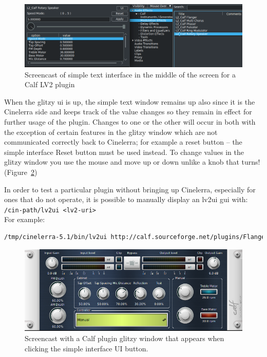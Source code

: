 \begin{figure}[htpb]
    \centering
    \includegraphics[width=0.9\linewidth]{images/calf.png}
    \caption{Screencast of simple text interface in the middle of the screen for a Calf LV2 plugin}
    \label{fig:calf}
\end{figure}

When the glitzy ui is up, the simple text window remains up also since it is the Cinelerra side and keeps track of the value changes so they remain in effect for further usage of the plugin. Changes to one or the other will occur in both with the exception of certain features in the glitzy window which are not communicated correctly back to Cinelerra; for example a reset button -- the simple interface Reset button must be used instead. To change values in the glitzy window you use the mouse and move up or down unlike a knob that turns! (Figure~\ref{fig:calf02})

In order to test a particular plugin without bringing up Cinelerra, especially for ones that do not operate, it is possible to manually display an lv2ui gui with: \\
\texttt{/cin-path/lv2ui <lv2-uri>} \\
For example:

\begin{lstlisting}[language=Bash,numbers=none]
/tmp/cinelerra-5.1/bin/lv2ui http://calf.sourceforge.net/plugins/Flanger
\end{lstlisting}

\begin{figure}[htpb]
    \centering
    \includegraphics[width=0.8\linewidth]{images/calf02.png}
    \caption{Screencast with a Calf plugin glitzy window that appears when clicking the simple interface UI button.}
    \label{fig:calf02}
\end{figure}

